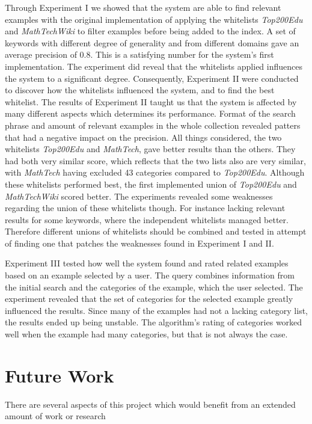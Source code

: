 Through Experiment I we showed that the system are able to find relevant examples with the original implementation of applying the whitelists \textit{Top200Edu} and \textit{MathTechWiki} to filter examples before being added to the index. A set of keywords with different degree of generality and from different domains gave an average precision of \(0.8\). This is a satisfying number for the system's first implementation. The experiment did reveal that the whitelists applied influences the system to a significant degree. Consequently, Experiment II were conducted to discover how the whitelists influenced the system, and to find the best whitelist. The results of Experiment II taught us that the system is affected by many different aspects which determines its performance. Format of the search phrase and amount of relevant examples in the whole collection revealed patters that had a negative impact on the precision. All things considered, the two whitelists \textit{Top200Edu} and \textit{MathTech}, gave better results than the others. They had both very similar score, which reflects that the two lists also are very similar, with \textit{MathTech} having excluded 43 categories compared to \textit{Top200Edu}. Although these whitelists performed best, the first implemented union of \textit{Top200Edu} and \textit{MathTechWiki} scored better. The experiments revealed some weaknesses regarding the union of these whitelists though. For instance lacking relevant results for some keywords, where the independent whitelists managed better. Therefore different unions of whitelists should be combined and tested in attempt of finding one that patches the weaknesses found in Experiment I and II.

Experiment III tested how well the system found and rated related examples based on an example selected by a user. The query combines information from the initial search and the categories of the example, which the user selected. The experiment revealed that the set of categories for the selected example greatly influenced the results. Since many of the examples had not a lacking category list, the results ended up being unstable. The algorithm's rating of categories worked well when the example had many categories, but that is not always the case.

\section{Future Work}
There are several aspects of this project which would benefit from an extended amount of work or research

